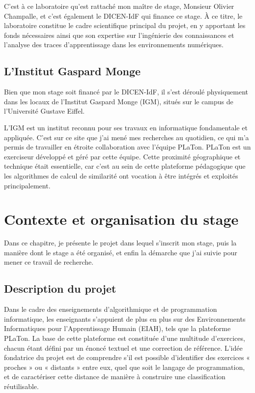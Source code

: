 \documentclass[12pt,a4paper,oneside]{report}
\begin{document}
C'est à ce laboratoire qu'est rattaché mon maître de stage, Monsieur Olivier
 Champalle, et c'est également le DICEN-IdF qui finance ce stage. À ce titre, le laboratoire constitue le cadre scientifique principal du
  projet, en y apportant les fonds nécessaires ainsi que son expertise sur
   l'ingénierie des connaissances et l'analyse des traces d'apprentissage dans 
   les environnements numériques.

\section{L'Institut Gaspard Monge}

Bien que mon stage soit financé par le DICEN-IdF, il s'est déroulé physiquement
 dans les locaux de l'Institut Gaspard Monge (IGM), situés sur le campus de 
 l'Université Gustave Eiffel. 

L'IGM est un institut reconnu pour ses travaux en informatique fondamentale et appliquée. C'est sur ce site que
 j'ai mené mes recherches au quotidien, ce qui m'a permis de travailler en
  étroite collaboration avec l'équipe PLaTon. PLaTon est un exerciseur
   développé et géré par cette équipe. Cette proximité 
  géographique et technique était essentielle, car c'est au sein de cette
   plateforme pédagogique que les algorithmes de calcul de similarité ont vocation à être intégrés et 
   exploités principalement.



\chapter{Contexte et organisation du stage}

Dans ce chapitre, je présente le projet dans lequel s'inscrit mon stage,
puis la manière dont le stage a été organisé, et enfin la
démarche que j'ai suivie pour mener ce travail de recherche.


\section{Description du projet}


Dans le cadre des enseignements d'algorithmique et de programmation
informatique, les enseignants s'appuient de plus en plus sur des
Environnements Informatiques pour l'Apprentissage Humain (EIAH), tels que
la plateforme PLaTon. La base de cette plateforme est constituée d'une
multitude d'exercices, chacun étant défini par un énoncé textuel et une
correction de référence. L'idée fondatrice du projet est de comprendre s'il
est possible d'identifier des exercices « proches » ou « distants » entre
eux, quel que soit le langage de programmation, et de caractériser cette
distance de manière à construire une classification réutilisable.
\end{document}
